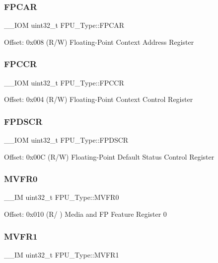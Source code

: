 \subsubsection{\texorpdfstring{FPCAR}{FPCAR}}
{\footnotesize\ttfamily \+\_\+\+\_\+\+I\+OM uint32\+\_\+t F\+P\+U\+\_\+\+Type\+::\+F\+P\+C\+AR}

Offset\+: 0x008 (R/W) Floating-\/\+Point Context Address Register \mbox{\label{struct_f_p_u___type_af1b708c5e413739150df3d16ca3b7061}} 
\subsubsection{\texorpdfstring{FPCCR}{FPCCR}}
{\footnotesize\ttfamily \+\_\+\+\_\+\+I\+OM uint32\+\_\+t F\+P\+U\+\_\+\+Type\+::\+F\+P\+C\+CR}

Offset\+: 0x004 (R/W) Floating-\/\+Point Context Control Register \mbox{\label{struct_f_p_u___type_a58d1989664a06db6ec2e122eefa9f04a}} 
\subsubsection{\texorpdfstring{FPDSCR}{FPDSCR}}
{\footnotesize\ttfamily \+\_\+\+\_\+\+I\+OM uint32\+\_\+t F\+P\+U\+\_\+\+Type\+::\+F\+P\+D\+S\+CR}

Offset\+: 0x00C (R/W) Floating-\/\+Point Default Status Control Register \mbox{\label{struct_f_p_u___type_a4f19014defe6033d070b80af19ef627c}} 
\subsubsection{\texorpdfstring{MVFR0}{MVFR0}}
{\footnotesize\ttfamily \+\_\+\+\_\+\+IM uint32\+\_\+t F\+P\+U\+\_\+\+Type\+::\+M\+V\+F\+R0}

Offset\+: 0x010 (R/ ) Media and FP Feature Register 0 \mbox{\label{struct_f_p_u___type_a66f8cfa49a423b480001a4e101bf842d}} 
\subsubsection{\texorpdfstring{MVFR1}{MVFR1}}
{\footnotesize\ttfamily \+\_\+\+\_\+\+IM uint32\+\_\+t F\+P\+U\+\_\+\+Type\+::\+M\+V\+F\+R1}

